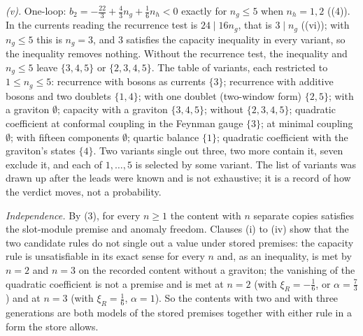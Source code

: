 \emph{(v).} One-loop: $b_{2} = -\tfrac{22}{3} + \tfrac43 n_{g} + \tfrac16 n_{h} < 0$ exactly for $n_{g} \le 5$ when $n_{h} = 1, 2$ ((4)). In the currents reading the recurrence test is $24 \mid 16n_{g}$, that is $3 \mid n_{g}$ ((vi)); with $n_{g} \le 5$ this is $n_{g} = 3$, and $3$ satisfies the capacity inequality in every variant, so the inequality removes nothing. Without the recurrence test, the inequality and $n_{g} \le 5$ leave $\{3, 4, 5\}$ or $\{2, 3, 4, 5\}$. The table of variants, each restricted to $1 \le n_{g} \le 5$: recurrence with bosons as currents $\{3\}$; recurrence with additive bosons and two doublets $\{1, 4\}$; with one doublet (two-window form) $\{2, 5\}$; with a graviton $\emptyset$; capacity with a graviton $\{3, 4, 5\}$; without $\{2, 3, 4, 5\}$; quadratic coefficient at conformal coupling in the Feynman gauge $\{3\}$; at minimal coupling $\emptyset$; with fifteen components $\emptyset$; quartic balance $\{1\}$; quadratic coefficient with the graviton's states $\{4\}$. Two variants single out three, two more contain it, seven exclude it, and each of $1, \dots, 5$ is selected by some variant. The list of variants was drawn up after the leads were known and is not exhaustive; it is a record of how the verdict moves, not a probability.

\emph{Independence.} By (3), for every $n \ge 1$ the content with $n$ separate copies satisfies the slot-module premise and anomaly freedom. Clauses (i) to (iv) show that the two candidate rules do not single out a value under stored premises: the capacity rule is unsatisfiable in its exact sense for every $n$ and, as an inequality, is met by $n = 2$ and $n = 3$ on the recorded content without a graviton; the vanishing of the quadratic coefficient is not a premise and is met at $n = 2$ (with $\xi_{R} = -\tfrac16$, or $\alpha = \tfrac73$) and at $n = 3$ (with $\xi_{R} = \tfrac16$, $\alpha = 1$). So the contents with two and with three generations are both models of the stored premises together with either rule in a form the store allows.

